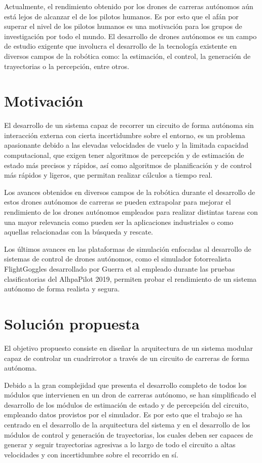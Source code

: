 Actualmente, el rendimiento obtenido por los drones de carreras autónomos aún está lejos de alcanzar el de los pilotos humanos. Es por esto que el afán por superar el nivel de los pilotos humanos es una motivación para los grupos de investigación por todo el mundo. El desarrollo de drones autónomos es un campo de estudio exigente que involucra el desarrollo de la tecnología existente en diversos campos de la robótica como: la estimación, el control, la generación de trayectorias o la percepción, entre otros. 

\section{Motivación}

El desarrollo de un sistema capaz de recorrer un circuito de forma autónoma sin interacción externa con cierta incertidumbre sobre el entorno, es un problema apasionante debido a las elevadas velocidades de vuelo y la limitada capacidad computacional, que exigen tener algoritmos de percepción y de estimación de estado más precisos y rápidos, así como algoritmos de planificación y de control más rápidos y ligeros, que permitan realizar cálculos a tiempo real.

Los avances obtenidos en diversos campos de la robótica durante el desarrollo de estos drones autónomos de carreras se pueden extrapolar para mejorar el rendimiento de los drones autónomos empleados para realizar distintas tareas con una mayor relevancia como pueden ser la aplicaciones industriales o como aquellas relacionadas con la búsqueda y rescate.

Los últimos avances en las plataformas de simulación enfocadas al desarrollo de sistemas de control de drones autónomos, como el simulador fotorrealista FlightGoggles desarrollado por Guerra et al \cite{guerra2019flightgoggles} empleado durante las pruebas clasificatorias del AlhpaPilot 2019, permiten probar el rendimiento de un sistema autónomo de forma realista y segura.



\section{Solución propuesta}
El objetivo propuesto consiste en diseñar la arquitectura de un sistema modular capaz de controlar un cuadrirrotor a través de un circuito de carreras de forma autónoma.

Debido a la gran complejidad que presenta el desarrollo completo de todos los módulos que intervienen en un dron de carreras autónomo, se han simplificado el desarrollo de los módulos de estimación de estado y de percepción del circuito, empleando datos provistos por el simulador. Es por esto que el trabajo se ha centrado en el desarrollo de la arquitectura del sistema y en el desarrollo de los módulos de control y generación de trayectorias, los cuales deben ser capaces de generar y seguir trayectorias agresivas a lo largo de todo el circuito a altas velocidades y con incertidumbre sobre el recorrido en sí.

